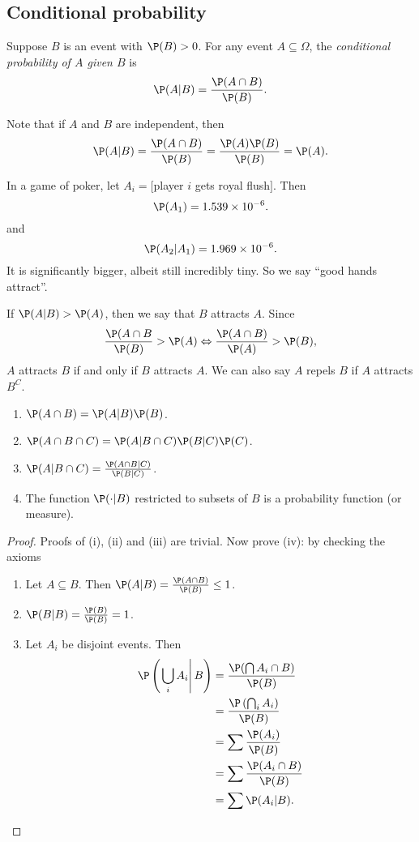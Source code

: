 \documentclass[a4paper]{article}
\begin{document}
\subsection{Conditional probability}
\begin{defi}
  Suppose $B$ is an event with $\P(B) > 0$. For any event $A\subseteq \Omega$, the \emph{conditional probability of $A$ given $B$} is
  \[
    \P(A|B) = \frac{\P(A\cap B)}{\P(B)}.
  \]
\end{defi}
Note that if $A$ and $B$ are independent, then
\[
  \P(A|B) = \frac{\P(A\cap B)}{\P(B)} = \frac{\P(A)\P(B)}{\P(B)} = \P(A).
\]
\begin{eg}
  In a game of poker, let $A_i = [$player $i$ gets royal flush$]$. Then
  \[
    \P(A_1) = 1.539\times 10^{-6}.
  \]
  and
  \[
    \P(A_2|A_1) = 1.969\times 10^{-6}.
  \]
  It is significantly bigger, albeit still incredibly tiny. So we say ``good hands attract''.
  
  If $\P(A|B) > \P(A)$, then we say that $B$ attracts $A$. Since
  \[
    \frac{\P(A\cap B}{\P(B)} > \P(A) \Leftrightarrow \frac{\P(A\cap B)}{\P(A)} > \P(B),
  \]
  $A$ attracts $B$ if and only if $B$ attracts $A$. We can also say $A$ repels $B$ if $A$ attracts $B^C$.
\end{eg}
\begin{thm}\leavevmode
  \begin{enumerate}
    \item $\P(A\cap B) = \P(A|B)\P(B)$.
    \item $\P(A\cap B\cap C) = \P(A|B\cap C) \P(B|C) \P(C)$.
    \item $\P(A|B\cap C) = \frac{\P(A\cap B|C)}{\P(B|C)}$.
    \item The function $\P(\cdot |B)$ restricted to subsets of $B$ is a probability function (or measure).
  \end{enumerate}
\end{thm}
\begin{proof}
  Proofs of (i), (ii) and (iii) are trivial. Now prove (iv): by checking the axioms

  \begin{enumerate}
    \item Let $A\subseteq B$. Then $\P(A|B) = \frac{\P(A\cap B)}{\P(B)} \leq 1$.
    \item $\P(B|B) = \frac{\P(B)}{\P(B)} = 1$.
    \item Let $A_i$ be disjoint events. Then 
      \begin{align*}
        \P\left(\left.\bigcup_i A_i\right|B\right) &= \frac{\P(\bigcap A_i\cap B)}{\P(B)}\\
        &= \frac{\P\left(\bigcap_i A_i\right)}{\P(B)}\\
        &= \sum \frac{\P(A_i)}{\P(B)}\\
        &=\sum \frac{\P(A_i\cap B)}{\P(B)}\\
        &= \sum \P(A_i | B).
      \end{align*}
  \end{enumerate}
\end{proof}
\end{document}
